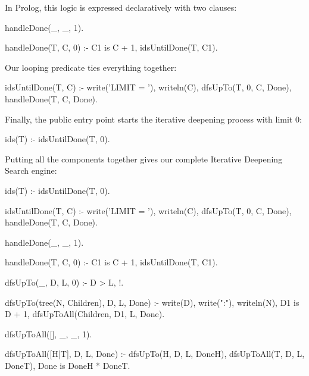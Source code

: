 In Prolog, this logic is expressed declaratively with two clauses:

\begin{codeblock}
handleDone(_, _, 1).

handleDone(T, C, 0) :-
    C1 is C + 1,
    idsUntilDone(T, C1).
\end{codeblock}

Our looping predicate ties everything together:

\begin{codeblock}
idsUntilDone(T, C) :-
    write('LIMIT = '), writeln(C),
    dfsUpTo(T, 0, C, Done),
    handleDone(T, C, Done).
\end{codeblock}

Finally, the public entry point starts the iterative deepening process with limit $0$:

\begin{codeblock}
ids(T) :- 
    idsUntilDone(T, 0).
\end{codeblock}

Putting all the components together gives our complete Iterative Deepening Search engine:

\begin{codeblock}
ids(T) :- 
    idsUntilDone(T, 0).

idsUntilDone(T, C) :-
    write('LIMIT = '), writeln(C),
    dfsUpTo(T, 0, C, Done),
    handleDone(T, C, Done).

handleDone(_, _, 1).

handleDone(T, C, 0) :-
    C1 is C + 1,
    idsUntilDone(T, C1).

dfsUpTo(_, D, L, 0) :-
    D > L,
    !.

dfsUpTo(tree(N, Children), D, L, Done) :-
    write(D), write(":"), writeln(N),
    D1 is D + 1,
    dfsUpToAll(Children, D1, L, Done).

dfsUpToAll([], _, _, 1).

dfsUpToAll([H|T], D, L, Done) :-
    dfsUpTo(H, D, L, DoneH),
    dfsUpToAll(T, D, L, DoneT),
    Done is DoneH * DoneT.
\end{codeblock}
